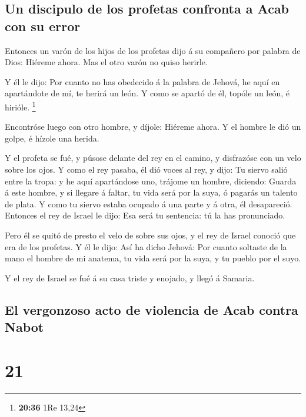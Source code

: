 \hypertarget{un-discipulo-de-los-profetas-confronta-a-acab-con-su-error}{%
\subsection{Un discipulo de los profetas confronta a Acab con su
error}\label{un-discipulo-de-los-profetas-confronta-a-acab-con-su-error}}

 Entonces un varón de los hijos de los profetas dijo á su
compañero por palabra de Dios: Hiéreme ahora. Mas el otro varón no quiso
herirle.

 Y él le dijo: Por cuanto no has obedecido á la palabra
de Jehová, he aquí en apartándote de mí, te herirá un león. Y como se
apartó de él, topóle un león, é hirióle. \footnote{\textbf{20:36} 1Re
  13,24}

 Encontróse luego con otro hombre, y díjole: Hiéreme
ahora. Y el hombre le dió un golpe, é hízole una herida.

 Y el profeta se fué, y púsose delante del rey en el
camino, y disfrazóse con un velo sobre los ojos.  Y como
el rey pasaba, él dió voces al rey, y dijo: Tu siervo salió entre la
tropa: y he aquí apartándose uno, trájome un hombre, diciendo: Guarda á
este hombre, y si llegare á faltar, tu vida será por la suya, ó pagarás
un talento de plata.  Y como tu siervo estaba ocupado á
una parte y á otra, él desapareció. Entonces el rey de Israel le dijo:
Esa será tu sentencia: tú la has pronunciado.

 Pero él se quitó de presto el velo de sobre sus ojos, y
el rey de Israel conoció que era de los profetas.  Y él
le dijo: Así ha dicho Jehová: Por cuanto soltaste de la mano el hombre
de mi anatema, tu vida será por la suya, y tu pueblo por el suyo.

 Y el rey de Israel se fué á su casa triste y enojado, y
llegó á Samaria.

\hypertarget{el-vergonzoso-acto-de-violencia-de-acab-contra-nabot}{%
\subsection{El vergonzoso acto de violencia de Acab contra
Nabot}\label{el-vergonzoso-acto-de-violencia-de-acab-contra-nabot}}

\hypertarget{section-20}{%
\section{21}\label{section-20}}

